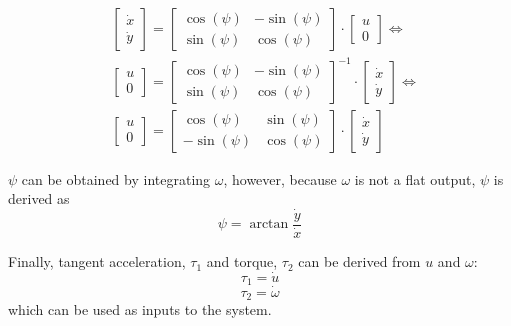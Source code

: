 \begin{equation}
\begin{split}
    & \begin{bmatrix}
        \dot{x} \\ \dot{y}
    \end{bmatrix} = 
    \begin{bmatrix}
        \cos(\psi) & - \sin(\psi) \\
        \sin(\psi) & \cos(\psi)
    \end{bmatrix} \cdot
    \begin{bmatrix}
        u \\ 0
    \end{bmatrix} \Leftrightarrow  \\
    & \begin{bmatrix}
        u \\ 0
    \end{bmatrix} = 
    \begin{bmatrix}
        \cos(\psi) & - \sin(\psi) \\
        \sin(\psi) & \cos(\psi)
    \end{bmatrix}^{-1} \cdot
    \begin{bmatrix}
        \dot{x} \\ \dot{y}
    \end{bmatrix} \Leftrightarrow \\
    & \begin{bmatrix}
        u \\ 0
    \end{bmatrix} = 
    \begin{bmatrix}
        \cos(\psi) & \sin(\psi) \\
        - \sin(\psi) & \cos(\psi)
    \end{bmatrix} \cdot
    \begin{bmatrix}
        \dot{x} \\ \dot{y}
    \end{bmatrix}
\end{split}
\end{equation}
\par $\psi$ can be obtained by integrating $\omega$, however, because $\omega$ is not a flat output, $\psi$ is derived as
\begin{equation}
    \psi = \arctan{\frac{\dot{y}}{\dot{x}}}
\end{equation}
\par Finally, tangent acceleration, $\tau_1$ and torque, $\tau_2$ can be derived from $u$ and $\omega$:
\begin{equation}
    \tau_1 = \dot{u}
\end{equation}
\begin{equation}
    \tau_2 = \dot{\omega}
\end{equation}
which can be used as inputs to the system.

